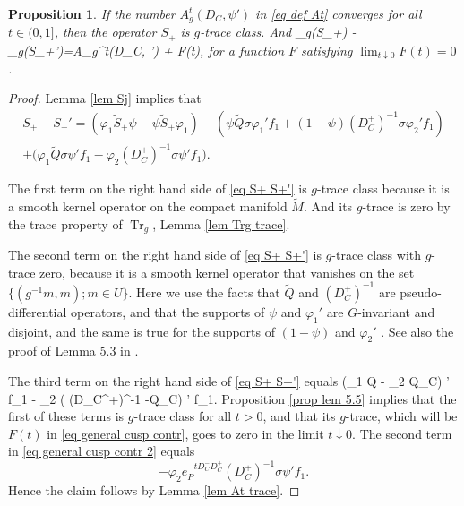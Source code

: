 \documentclass[11pt]{article}
\theoremstyle{plain}
\newtheorem{proposition}[theorem]{Proposition}
\theoremstyle{definition}
\theoremstyle{remark}
\numberwithin{equation}{section}
\DeclareMathOperator{\Tr}{Tr}
\begin{document}
\begin{proposition}\label{prop general cusp contr}
If the number $A_{g}^t(D_C, \psi')$ in \eqref{eq def At}
converges
for all $t \in (0,1]$, then
the operator $S_+$ is $g$-trace class. And
\Tr_g(S_+) - \Tr_g(S_+')=A_{g}^t(D_C, \psi') + F(t),
\eeq
for a function $F$ satisfying $\lim_{t\downarrow 0}F(t) = 0$.
\end{proposition}
\begin{proof}
Lemma \ref{lem Sj} implies that
\begin{multline}\label{eq S+ S+'}
S_+ - S_+' = (\varphi_1 \tilde S_+ \psi - \psi \tilde S_+ \varphi_1) -
(\psi \tilde Q \sigma \varphi_1' f_1 + (1-\psi) (D_C^+)^{-1} \sigma \varphi_2' f_1) \\
+
\bigl(\varphi_1 \tilde Q\sigma \psi' f_1 - \varphi_2 (D_C^+)^{-1} \sigma \psi' f_1\bigr) .
\end{multline}

The first term on the right hand side of \eqref{eq S+ S+'} is $g$-trace class because it is a smooth kernel operator on the compact manifold $\tilde M$. And its $g$-trace is zero  by the trace property of $\Tr_g$, Lemma \ref{lem Trg trace}.

The second term on the right hand side of \eqref{eq S+ S+'} is $g$-trace class with $g$-trace zero, because it is a smooth kernel operator that vanishes on the set $\{ (g^{-1}m,m); m \in U\}$.
Here we use the facts that $\tilde Q$ and $(D_C^+)^{-1}$ are pseudo-differential operators, and that the supports of $\psi$ and $\varphi_1'$ are $G$-invariant and disjoint, and the same is true for the supports of $(1-\psi)$ and $\varphi_2'$ .
See also the proof of Lemma 5.3 in \cite{HWW}.

The third term on the right hand side of \eqref{eq S+ S+'} equals
(\varphi_1 \tilde Q - \varphi_2 Q_C) \sigma \psi' f_1 -  \varphi_2 ( (D_C^+)^{-1} -Q_C) \sigma \psi' f_1.
\eeq
Proposition \ref{prop lem 5.5} implies that the first of these terms is $g$-trace class for all $t>0$, and that its $g$-trace, which will be $F(t)$ in \eqref{eq general cusp contr},  goes to zero in the limit $t \downarrow 0$.
The second term in \eqref{eq general cusp contr 2} equals
\[
-\varphi_2  e_P^{-t D_C^- D_C^+} (D_C^+)^{-1}  \sigma \psi' f_1.
\]
Hence the claim follows by Lemma \ref{lem At trace}.
%
\end{proof}
\end{document}
